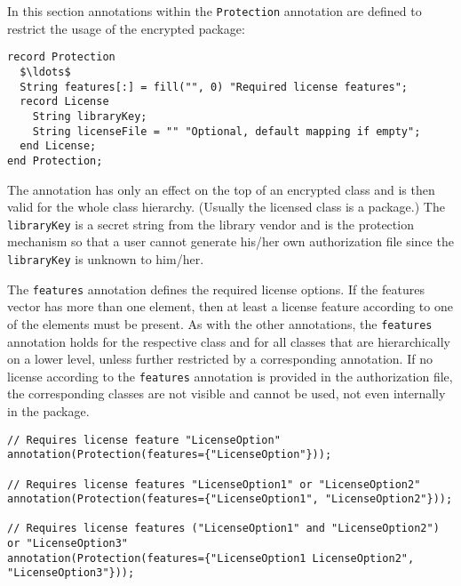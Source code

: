 In this section annotations within the \lstinline!Protection! annotation are
defined to restrict the usage of the encrypted package:
\begin{lstlisting}[language=modelica]
record Protection
  $\ldots$
  String features[:] = fill("", 0) "Required license features";
  record License
    String libraryKey;
    String licenseFile = "" "Optional, default mapping if empty";
  end License;
end Protection;
\end{lstlisting}
The  annotation has only an effect on the top of an encrypted class and is then valid for the whole class hierarchy.
(Usually the licensed class is a package.)
The \lstinline!libraryKey! is a secret string from the library vendor and is the protection mechanism so that a user cannot generate his/her own authorization file since the \lstinline!libraryKey! is unknown to him/her.

The \lstinline!features! annotation defines the required license options. If the
features vector has more than one element, then at least a license
feature according to one of the elements must be present. As with the
other annotations, the \lstinline!features! annotation holds for the respective
class and for all classes that are hierarchically on a lower level,
unless further restricted by a corresponding annotation. If no license
according to the \lstinline!features! annotation is provided in the
authorization file, the corresponding classes are not visible and cannot
be used, not even internally in the package.

\begin{example}
\begin{lstlisting}[language=modelica]
// Requires license feature "LicenseOption"
annotation(Protection(features={"LicenseOption"}));

// Requires license features "LicenseOption1" or "LicenseOption2"
annotation(Protection(features={"LicenseOption1", "LicenseOption2"}));

// Requires license features ("LicenseOption1" and "LicenseOption2") or "LicenseOption3"
annotation(Protection(features={"LicenseOption1 LicenseOption2", "LicenseOption3"}));
\end{lstlisting}
\end{example}

